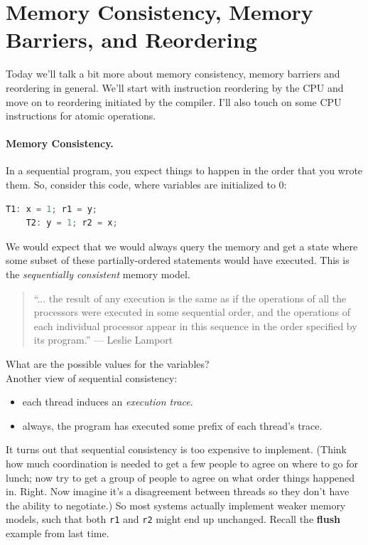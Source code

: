 \documentclass[a4paper]{report}
\begin{document}

\section*{Memory Consistency, Memory Barriers, and Reordering}
Today we'll talk a bit more about memory consistency, memory barriers
and reordering in general. We'll start with instruction reordering by
the CPU and move on to reordering initiated by the compiler.  I'll
also touch on some CPU instructions for atomic operations.

\paragraph{Memory Consistency.} In a sequential program, you expect
things to happen in the order that you wrote them. So, consider this code,
where variables are initialized to 0:

\begin{center}
\begin{lstlisting}[language=C]
    T1: x = 1; r1 = y;
    T2: y = 1; r2 = x;
\end{lstlisting}
\end{center}
We would expect that we would always query the memory and get a state
where some subset of these partially-ordered statements would have executed.
This is the \emph{sequentially consistent} memory model.

\begin{quote}
``... the result of any execution is the same as if the operations of all the processors were executed in some sequential order, and the operations of each individual processor appear in this sequence in the order specified by its program.'' --- Leslie Lamport
\end{quote}

{\sf What are the possible values for the variables?}\\[3em]

Another view of sequential consistency:
\begin{itemize}
      \item each thread induces an \emph{execution trace}.
      \item always, the program has executed some prefix of each thread's
        trace.
\end{itemize}


It turns out that sequential consistency is too expensive to implement.
(Think how much coordination is needed to get a few people to agree on where to go for lunch; now try to get a group of people to agree on what order things happened in. Right. Now imagine it's a disagreement between threads so they don't have the ability to negotiate.) So most systems actually implement weaker memory models,
such that both {\tt r1} and {\tt r2} might end up unchanged. Recall the 
{\bf flush} example from last time.
\end{document}
